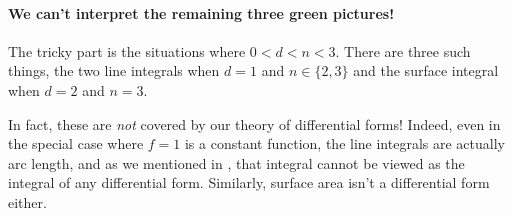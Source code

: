\paragraph{We can't interpret the remaining three green pictures!}
The tricky part is the situations where $0 < d < n < 3$.
There are three such things, the two line integrals when $d=1$ and $n \in \{2,3\}$
and the surface integral when $d=2$ and $n=3$.

In fact, these are \emph{not} covered by our theory of differential forms!
Indeed, even in the special case where $f = 1$ is a constant function,
the line integrals are actually arc length,
and as we mentioned in ,
that integral cannot be viewed as the integral of any differential form.
Similarly, surface area isn't a differential form either.

